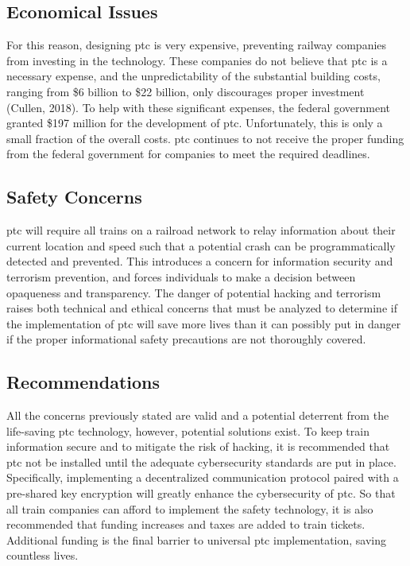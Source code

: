 \documentclass[11pt, titlepage]{article}
\begin{document}
\subsection{Economical Issues}

For this reason, designing \gls{ptc} is very expensive, preventing railway
companies from investing in the technology. These companies do not believe that
\gls{ptc} is a necessary expense, and the unpredictability of the substantial
building costs, ranging from \$6 billion to \$22 billion, only discourages proper
investment (Cullen, 2018). To help with these significant expenses, the federal
government granted \$197 million for the development of \gls{ptc}. Unfortunately,
this is only a small fraction of the overall costs. \gls{ptc} continues to not
receive the proper funding from the federal government for companies to meet the
required deadlines.

\subsection{Safety Concerns}

\gls{ptc} will require all trains on a railroad network to relay information about
their current location and speed such that a potential crash can be
programmatically detected and prevented. This introduces a concern for information
security and terrorism prevention, and forces individuals to make a decision
between opaqueness and transparency. The danger of potential hacking and terrorism
raises both technical and ethical concerns that must be analyzed to determine if
the implementation of \gls{ptc} will save more lives than it can possibly put in
danger if the proper informational safety precautions are not thoroughly covered.

\subsection{Recommendations}

All the concerns previously stated are valid and a potential deterrent from the
life-saving \gls{ptc} technology, however, potential solutions exist. To keep
train information secure and to mitigate the risk of hacking, it is recommended
that \gls{ptc} not be installed until the adequate cybersecurity standards are put
in place. Specifically, implementing a decentralized communication protocol paired
with a pre-shared key encryption will greatly enhance the cybersecurity of
\gls{ptc}. So that all train companies can afford to implement the safety
technology, it is also recommended that funding increases and taxes are added to
train tickets. Additional funding is the final barrier to universal \gls{ptc}
implementation, saving countless lives.
\end{document}

